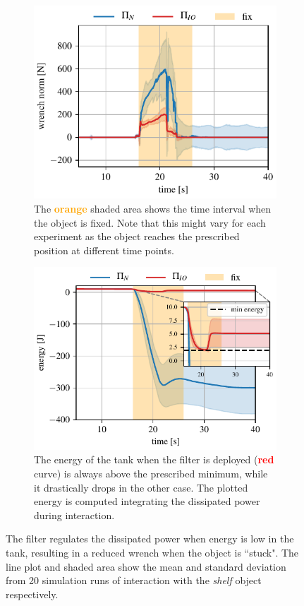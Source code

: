 \begin{figure}[t]
\centering
\begin{subfigure}{\columnwidth}
\centering
    \includegraphics[width=0.8\linewidth]{figures/fix_experiment/wrench_with_without_tank.pdf}
    \caption{The  \textcolor{orange}{\textbf{orange}} shaded area shows the time interval when the object is fixed. Note that this might vary for each experiment as the object reaches the prescribed position at different time points.}
\end{subfigure}
\begin{subfigure}{\columnwidth}
\centering
    \includegraphics[width=0.8\linewidth]{figures/fix_experiment/energy_with_without_tank.pdf}
    \caption{The energy of the tank when the filter is deployed (\textcolor{red}{\textbf{red}} curve) is always above the prescribed minimum, while it drastically drops in the other case. The plotted energy is computed integrating the dissipated power during interaction.}
\end{subfigure}
\hfill
\caption{The filter regulates the dissipated power when energy is low in the tank, resulting in a reduced wrench when the object is ``stuck". The line plot and shaded area show the mean and standard deviation from 20 simulation runs of interaction with the \textit{shelf} object respectively.}\label{fig:tank_comparison}
\end{figure}

